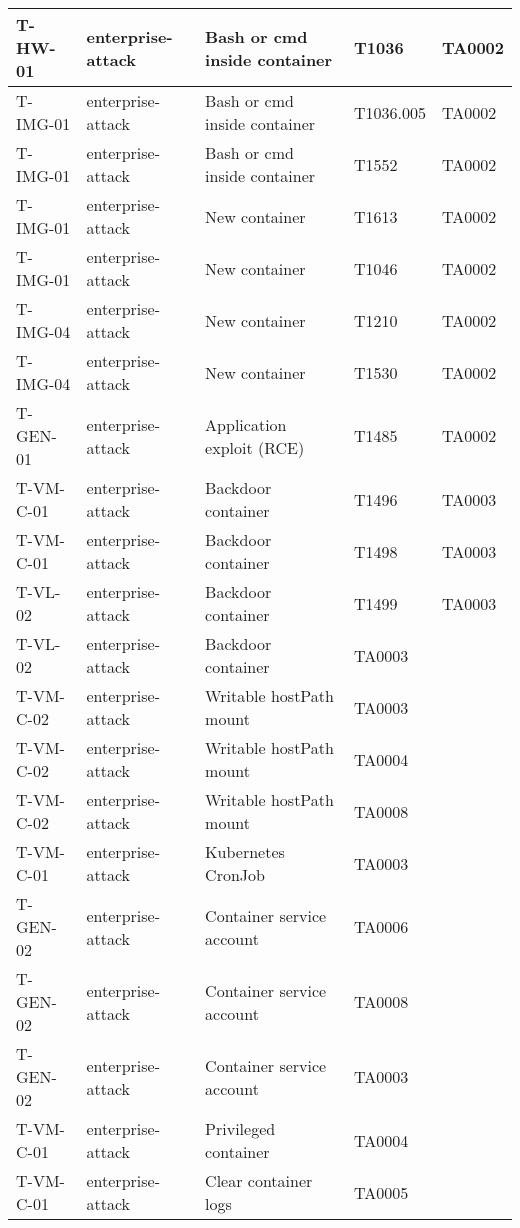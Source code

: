 \begin{table}[!ht]
\begin{tabular}{|l|l|l|l|l|}
        T-HW-01 & enterprise-attack & Bash or cmd inside container & T1036 & TA0002 \\ \hline
        T-IMG-01 & enterprise-attack & Bash or cmd inside container & T1036.005 & TA0002 \\ \hline
        T-IMG-01 & enterprise-attack & Bash or cmd inside container & T1552 & TA0002 \\ \hline
        T-IMG-01 & enterprise-attack & New container & T1613 & TA0002 \\ \hline
        T-IMG-01 & enterprise-attack & New container & T1046 & TA0002 \\ \hline
        T-IMG-04 & enterprise-attack & New container & T1210 & TA0002 \\ \hline
        T-IMG-04 & enterprise-attack & New container & T1530 & TA0002 \\ \hline
        T-GEN-01 & enterprise-attack & Application exploit (RCE) & T1485 & TA0002 \\ \hline
        T-VM-C-01 & enterprise-attack & Backdoor container & T1496 & TA0003 \\ \hline
        T-VM-C-01 & enterprise-attack & Backdoor container & T1498 & TA0003 \\ \hline
        T-VL-02 & enterprise-attack & Backdoor container & T1499 & TA0003 \\ \hline
        T-VL-02 & enterprise-attack & Backdoor container & TA0003 & ~ \\ \hline
        T-VM-C-02 & enterprise-attack & Writable hostPath mount & TA0003 & ~ \\ \hline
        T-VM-C-02 & enterprise-attack & Writable hostPath mount & TA0004 & ~ \\ \hline
        T-VM-C-02 & enterprise-attack & Writable hostPath mount & TA0008 & ~ \\ \hline
        T-VM-C-01 & enterprise-attack & Kubernetes CronJob & TA0003 & ~ \\ \hline
        T-GEN-02 & enterprise-attack & Container service account & TA0006 & ~ \\ \hline
        T-GEN-02 & enterprise-attack & Container service account & TA0008 & ~ \\ \hline
        T-GEN-02 & enterprise-attack & Container service account & TA0003 & ~ \\ \hline
        T-VM-C-01 & enterprise-attack & Privileged container & TA0004 & ~ \\ \hline
        T-VM-C-01 & enterprise-attack & Clear container logs & TA0005 & ~ \\ \hline

\end{tabular}
\end{table}
